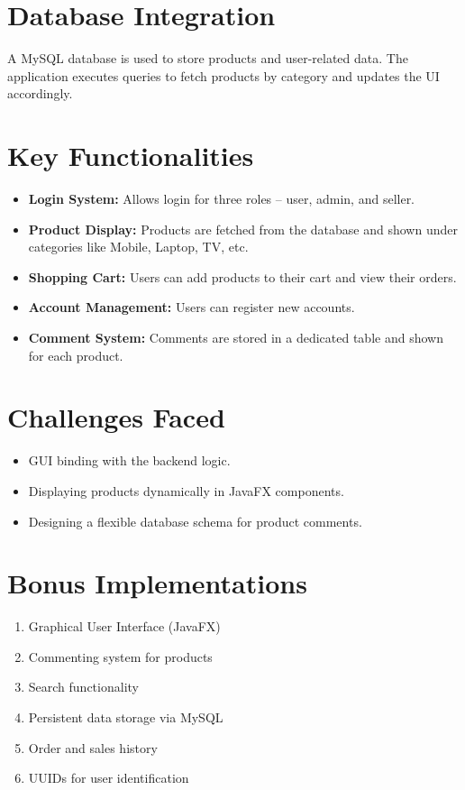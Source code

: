 \documentclass[12pt]{article}
\begin{document}
\section{Database Integration}
A MySQL database is used to store products and user-related data. The application executes queries to fetch products by category and updates the UI accordingly.

\section{Key Functionalities}
\begin{itemize}
    \item \textbf{Login System:} Allows login for three roles – user, admin, and seller.
    \item \textbf{Product Display:} Products are fetched from the database and shown under categories like Mobile, Laptop, TV, etc.
    \item \textbf{Shopping Cart:} Users can add products to their cart and view their orders.
    \item \textbf{Account Management:} Users can register new accounts.
    \item \textbf{Comment System:} Comments are stored in a dedicated table and shown for each product.
\end{itemize}

\section{Challenges Faced}
\begin{itemize}
    \item GUI binding with the backend logic.
    \item Displaying products dynamically in JavaFX components.
    \item Designing a flexible database schema for product comments.
\end{itemize}

\section{Bonus Implementations}
\begin{enumerate}
    \item Graphical User Interface (JavaFX)
    \item Commenting system for products
    \item Search functionality
    \item Persistent data storage via MySQL
    \item Order and sales history
    \item UUIDs for user identification
\end{enumerate}
\end{document}
